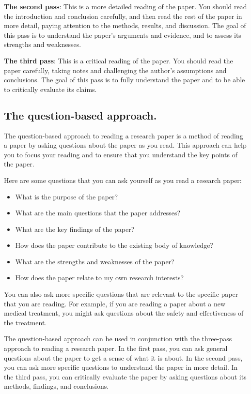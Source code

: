 \documentclass[
  b5paper]{book}
\begin{document}
\textbf{The second pass}: This is a more detailed reading of the paper. You should read the introduction and conclusion carefully, and then read the rest of the paper in more detail, paying attention to the methods, results, and discussion. The goal of this pass is to understand the paper's arguments and evidence, and to assess its strengths and weaknesses.

\textbf{The third pass}: This is a critical reading of the paper. You should read the paper carefully, taking notes and challenging the author's assumptions and conclusions. The goal of this pass is to fully understand the paper and to be able to critically evaluate its claims.

\hypertarget{the-question-based-approach.}{%
\subsection*{The question-based approach.}\label{the-question-based-approach.}}

The question-based approach to reading a research paper is a method of reading a paper by asking questions about the paper as you read. This approach can help you to focus your reading and to ensure that you understand the key points of the paper.

Here are some questions that you can ask yourself as you read a research paper:

\begin{itemize}
\item
  What is the purpose of the paper?
\item
  What are the main questions that the paper addresses?
\item
  What are the key findings of the paper?
\item
  How does the paper contribute to the existing body of knowledge?
\item
  What are the strengths and weaknesses of the paper?
\item
  How does the paper relate to my own research interests?
\end{itemize}

You can also ask more specific questions that are relevant to the specific paper that you are reading. For example, if you are reading a paper about a new medical treatment, you might ask questions about the safety and effectiveness of the treatment.

The question-based approach can be used in conjunction with the three-pass approach to reading a research paper. In the first pass, you can ask general questions about the paper to get a sense of what it is about. In the second pass, you can ask more specific questions to understand the paper in more detail. In the third pass, you can critically evaluate the paper by asking questions about its methods, findings, and conclusions.
\end{document}
